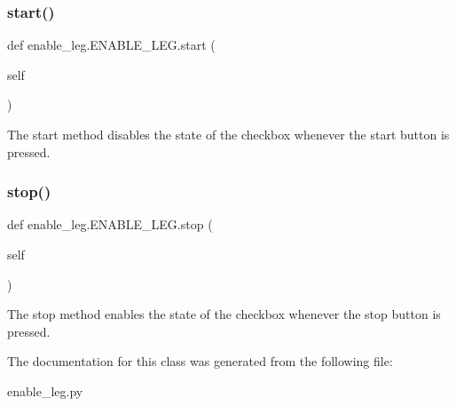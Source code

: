 \subsubsection{\texorpdfstring{start()}{start()}}
{\footnotesize\ttfamily def enable\+\_\+leg.\+E\+N\+A\+B\+L\+E\+\_\+\+L\+E\+G.\+start (\begin{DoxyParamCaption}\item[{}]{self }\end{DoxyParamCaption})}



The start method disables the state of the checkbox whenever the start button is pressed. 

\mbox{\label{classenable__leg_1_1ENABLE__LEG_a121e6b0432842f4250529f1b5c65ed63}} 
\subsubsection{\texorpdfstring{stop()}{stop()}}
{\footnotesize\ttfamily def enable\+\_\+leg.\+E\+N\+A\+B\+L\+E\+\_\+\+L\+E\+G.\+stop (\begin{DoxyParamCaption}\item[{}]{self }\end{DoxyParamCaption})}



The stop method enables the state of the checkbox whenever the stop button is pressed. 



The documentation for this class was generated from the following file\+:\begin{DoxyCompactItemize}
\item 
enable\+\_\+leg.\+py\end{DoxyCompactItemize}
